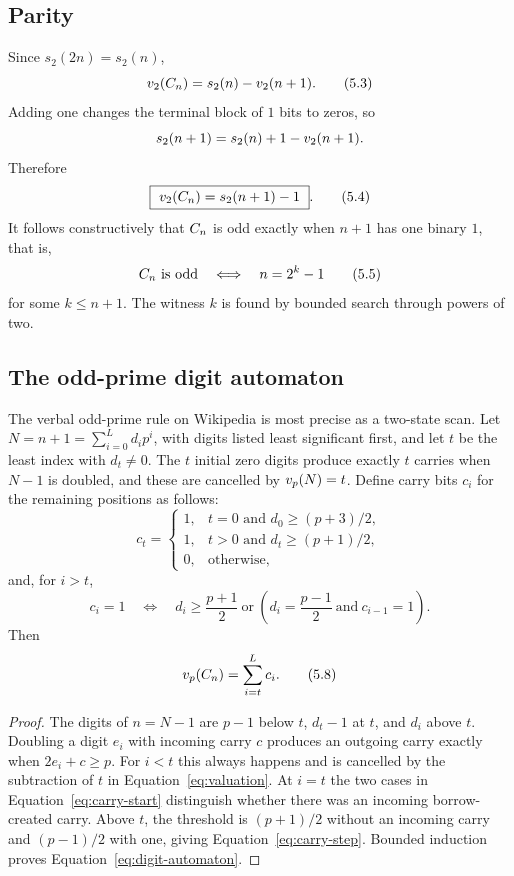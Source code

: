 \subsection{Parity}

Since $s_2(2n)=s_2(n)$,
\[
 v_{2}(C_n)=s_2(n)-v_{2}(n+1).                                \tag{5.3}
\]
Adding one changes the terminal block of $1$ bits to zeros, so
\[
 s_2(n+1)=s_2(n)+1-v_{2}(n+1).
\]
Therefore
\[
 \boxed{\ \vp 2(\Cat_n)=s_2(n+1)-1\ }.                          \tag{5.4}\label{eq:v2}
\]
It follows constructively that $C_n$ is odd exactly when $n+1$ has one
binary $1$, that is,
\[
 C_n\text{ is odd}\quad\Longleftrightarrow\quad n=2^k-1       \tag{5.5}\label{eq:odd}
\]
for some $k\le n+1$.  The witness $k$ is found by bounded search through
powers of two.

\subsection{The odd-prime digit automaton}

The verbal odd-prime rule on Wikipedia is most precise as a two-state scan.
Let $N=n+1=\sum_{i=0}^{L}d_ip^i$, with digits listed least significant first,
and let $t$ be the least index with $d_t\ne0$.  The $t$ initial zero digits
produce exactly $t$ carries when $N-1$ is doubled, and these are cancelled by
$v_{p}(N)=t$.  Define carry bits $c_i$ for the remaining positions as follows:
\[
 c_t=
 \begin{cases}
  1,&t=0\text{ and }d_0\ge(p+3)/2,\\
  1,&t>0\text{ and }d_t\ge(p+1)/2,\\
  0,&\text{otherwise},
 \end{cases}                                                     \tag{5.6}\label{eq:carry-start}
\]
and, for $i>t$,
\[
 c_i=1\quad\Longleftrightarrow\quad
 d_i\ge\frac{p+1}{2}
 \ \text{or}\ 
 \left(d_i=\frac{p-1}{2}\ \text{and}\ c_{i-1}=1\right).        \tag{5.7}\label{eq:carry-step}
\]
Then
\[
 v_{p}(C_n)=\sum_{i=t}^{L}c_i.                               \tag{5.8}\label{eq:digit-automaton}
\]

\begin{proof}
The digits of $n=N-1$ are $p-1$ below $t$, $d_t-1$ at $t$, and $d_i$ above
$t$.  Doubling a digit $e_i$ with incoming carry $c$ produces an outgoing
carry exactly when $2e_i+c\ge p$.  For $i<t$ this always happens and is
cancelled by the subtraction of $t$ in Equation~\eqref{eq:valuation}.  At
$i=t$ the two cases in Equation~\eqref{eq:carry-start} distinguish whether there was
an incoming borrow-created carry.  Above $t$, the threshold is
$(p+1)/2$ without an incoming carry and $(p-1)/2$ with one, giving
Equation~\eqref{eq:carry-step}.  Bounded induction proves Equation~\eqref{eq:digit-automaton}.
\end{proof}

